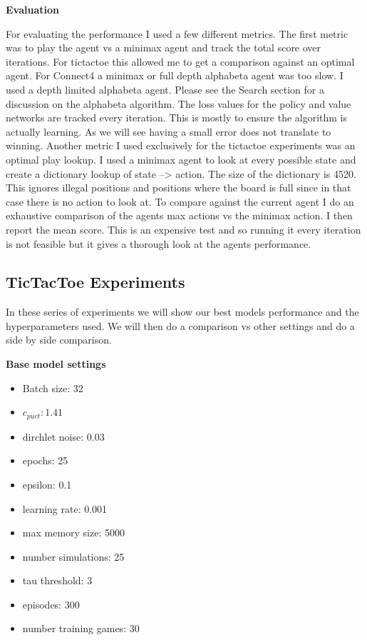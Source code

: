 \textbf{Evaluation}

For evaluating the performance I used a few different metrics. The first metric was to play the agent vs a minimax agent and track the total score over iterations. For tictactoe this allowed me to get a comparison against an optimal agent. For Connect4 a minimax or full depth alphabeta agent was too slow. I used a depth limited alphabeta agent. Please see the Search section for a discussion on the alphabeta algorithm. The loss values for the policy and value networks are tracked every iteration. This is mostly to ensure the algorithm is actually learning. As we will see having a small error does not translate to winning. Another metric I used exclusively for the tictactoe experiments was an optimal play lookup. I used a minimax agent to look at every possible state and create a dictionary lookup of state --> action. The size of the dictionary is 4520. This ignores illegal positions and positions where the board is full since in that case there is no action to look at. To compare against the current agent I do an exhaustive comparison of the agents max actions vs the minimax action. I then report the mean score. This is an expensive test and so running it every iteration is not feasible but it gives a thorough look at the agents performance. 


\subsection{TicTacToe Experiments}

In these series of experiments we will show our best models performance and the hyperparameters used. We will then do a comparison vs other settings and do a side by side comparison. 

\textbf{Base model settings}

\begin{multicols}{2}

\begin{itemize}
    \item Batch size: 32
    \item $c_{puct}: 1.41$
    \item dirchlet noise: 0.03
    \item epochs: 25
    \item epsilon: 0.1

\end{itemize}

\begin{itemize}
    \item learning rate: 0.001
    \item max memory size: 5000
    \item number simulations: 25
    \item tau threshold: 3
    \item episodes: 300
    \item number training games: 30
\end{itemize}

\end{multicols}


